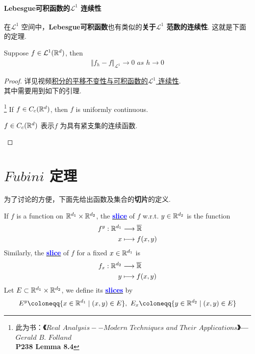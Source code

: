 \vspace{2em}
\paragraph{\textbf{Lebesgue可积函数的$\mathcal{L}^1$ 连续性}}
	在$\mathcal{L}^1$ 空间中，\textbf{Lebesgue可积函数}也有类似的\textbf{关于$\mathcal{L}^1$ 范数的连续性}. 这就是下面的定理.
	\begin{thm}\label{thm 3.4.1}
		Suppose $f \in \mathcal{L}^{1}(\mathbb{R}^d)$, then
		\begin{align}
			\Vert f_h - f \Vert_{\mathcal{L}^1} \to 0 \,\, as \,\, h \to 0
		\end{align}
		
		\vspace{2em}
		\begin{proof}
			详见视频\href{https://www.bilibili.com/video/BV1FT411C7wM?p=25}{积分的平移不变性与可积函数的$\mathcal{L}^1$ 连续性}. \\
			其中需要用到如下的引理.
			\begin{lemma}\label{lemma 3.4.2}\footnote{此为书：\textbf{《$Real \,\, Analysis -- Modern \,\, Techniques \,\, and \,\, Their \,\, Applications$》--- $Gerald \,\, B. \,\, Folland$} \\
					\textbf{P238 Lemma 8.4}}
				If $f \in C_{c}(\mathbb{R}^d)$, then $f$ is uniformly continuous.
				
				\vspace{1em}
				\begin{rmk}
					$f \in C_{c}(\mathbb{R}^d)$ 表示$f$ 为具有紧支集的连续函数.
				\end{rmk}
			\end{lemma}
		\end{proof}
	\end{thm}

\newpage
\section{$Fubini$ 定理}
	为了讨论的方便，下面先给出函数及集合的\textbf{切片}的定义.
	\begin{defn}\label{def 3.5.1}
		If $f$ is a function on $\mathbb{R}^{d_1} \times \mathbb{R}^{d_2}$, the \underline{\textcolor{blue}{\textbf{slice}}} of $f$ w.r.t. $y \in \mathbb{R}^{d_2}$ is the function
		\begin{align}
			f^y : \mathbb{R}^{d_1} &\longrightarrow \overline{\mathbb{R}} \\
			x &\longmapsto f(x , y)
		\end{align}
		Similarly, the \underline{\textcolor{blue}{\textbf{slice}}} of $f$ for a fixed $x \in \mathbb{R}^{d_1}$ is
		\begin{align}
			f_x : \mathbb{R}^{d_2} &\longrightarrow \overline{\mathbb{R}} \\
			y &\longmapsto f(x , y)
		\end{align}
		Let $E \subset \mathbb{R}^{d_1} \times \mathbb{R}^{d_2}$, we define its \underline{\textcolor{blue}{\textbf{slices}}} by
		\begin{align}
			E^y \coloneqq \{ x \in \R^{d_1} \mid (x , y) \in E \} , \,\, E_x \coloneqq \{ y \in \R^{d_2} \mid (x , y) \in E \}
		\end{align}
	\end{defn}

